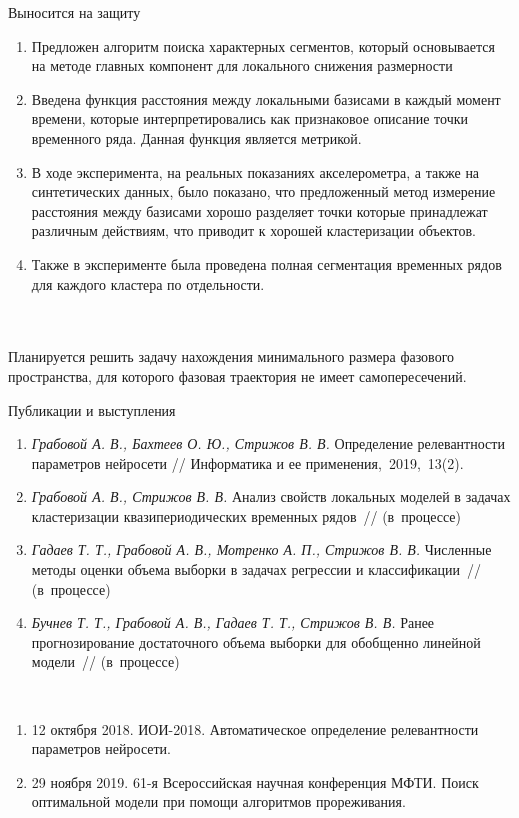 \documentclass[9pt,pdf,hyperref={unicode}]{beamer}
\begin{document}
\begin{frame}{Выносится на защиту}
\justifying

	\begin{enumerate}
	\justifying
		\item Предложен алгоритм поиска характерных сегментов, который основывается на методе главных компонент для локального снижения размерности
		\item Введена функция расстояния между локальными базисами в каждый момент времени, которые интерпретировались как признаковое описание точки временного ряда. Данная функция является метрикой.
		\item В ходе эксперимента, на реальных показаниях акселерометра, а также на синтетических данных, было показано, что предложенный метод измерение расстояния между базисами хорошо разделяет точки которые принадлежат различным действиям, что приводит к хорошей кластеризации объектов.
		\item Также в эксперименте была проведена полная сегментация временных рядов для каждого кластера по отдельности.
	\end{enumerate}
	
~\\
~\\
	Планируется решить задачу нахождения минимального размера фазового пространства, для которого  фазовая траектория не имеет самопересечений.
\end{frame}
\begin{frame}{Публикации и выступления}
\justifying
	\begin{enumerate}
	\justifying
		\item \textit{Грабовой А. В., Бахтеев О. Ю., Стрижов В. В.} Определение релевантности параметров нейросети // Информатика и ее применения,~2019,~13(2).
		\item \textit{Грабовой А. В., Стрижов В. В.} Анализ свойств локальных моделей в задачах кластеризации квазипериодических временных рядов~// (в~процессе)
		\item \textit{Гадаев Т. Т., Грабовой А. В., Мотренко А. П., Стрижов В. В.} Численные методы оценки объема выборки в задачах регрессии и классификации~// (в~процессе)
		\item \textit{Бучнев Т. Т., Грабовой А. В., Гадаев Т. Т., Стрижов В. В.} Ранее прогнозирование достаточного объема выборки для обобщенно линейной модели~// (в~процессе)
	\end{enumerate}
	
~\\
	\begin{enumerate}
	\justifying
		\item 12 октября 2018. ИОИ-2018. Автоматическое определение релевантности параметров нейросети.
		\item 29 ноября 2019. 61-я Всероссийская научная конференция МФТИ. Поиск оптимальной модели при помощи алгоритмов прореживания.
	\end{enumerate}
	
	
\end{frame}
\end{document}
